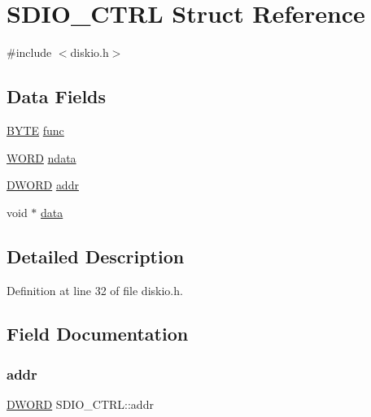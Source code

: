\hypertarget{structSDIO__CTRL}{}\section{S\+D\+I\+O\+\_\+\+C\+T\+RL Struct Reference}
\label{structSDIO__CTRL}


{\ttfamily \#include $<$diskio.\+h$>$}

\subsection*{Data Fields}
\begin{DoxyCompactItemize}
\item 
\hyperlink{integer_8h_a4ae1dab0fb4b072a66584546209e7d58}{B\+Y\+TE} \hyperlink{structSDIO__CTRL_a2f0a17848a6c7c58f826d1888469e6e3}{func}
\item 
\hyperlink{integer_8h_a197942eefa7db30960ae396d68339b97}{W\+O\+RD} \hyperlink{structSDIO__CTRL_a44edc7d37688ac4f3a1ba3d66e909767}{ndata}
\item 
\hyperlink{integer_8h_ad342ac907eb044443153a22f964bf0af}{D\+W\+O\+RD} \hyperlink{structSDIO__CTRL_a15025848d3f3733f366504d30a1d9bb2}{addr}
\item 
void $\ast$ \hyperlink{structSDIO__CTRL_ab04c9adb4d3027a14925fb30b469f0c0}{data}
\end{DoxyCompactItemize}


\subsection{Detailed Description}


Definition at line 32 of file diskio.\+h.



\subsection{Field Documentation}
\mbox{\label{structSDIO__CTRL_a15025848d3f3733f366504d30a1d9bb2}} 
\subsubsection{\texorpdfstring{addr}{addr}}
{\footnotesize\ttfamily \hyperlink{integer_8h_ad342ac907eb044443153a22f964bf0af}{D\+W\+O\+RD} S\+D\+I\+O\+\_\+\+C\+T\+R\+L\+::addr}



